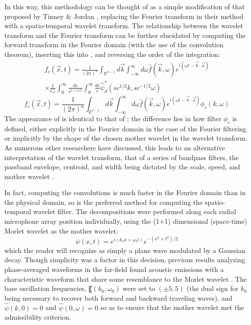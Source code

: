 In this way, this methodology can be thought of as a simple modification of that proposed by Tinney \& Jordan \citep{Tinney2008}, replacing the Fourier transform in their method with a spatio-temporal wavelet transform. 
The relationship between the wavelet transform and the Fourier transform can be further elucidated by computing the forward transform in the Fourier domain (with the use of the convolution theorem), inserting this into , and reversing the order of the integration:
\begin{multline}
		f_c (\vec{x},t) = \frac{1}{(2 \pi)^n} \int_{\mathbb{R}^{n-1}} d \vec{k} \int_{-\infty}^{\infty} d\omega \hat{f}(\vec{k},\omega) e^{i(\omega t - \vec{k} \cdot \vec{x})} \\ 
		\times \frac{1}{C_\delta} \int_0^\infty \frac{ds}{s^{1 + n/2}} \int_{0}^{\infty} \frac{dc}{c} \hat{\psi}_d^* (sc^{1/2}k,sc^{-1/2} \omega)
\end{multline}
\begin{equation}
	f_c (\vec{x},t) = \frac{1}{(2 \pi)^n} \int_{\mathbb{R}^{n-1}} d \vec{k} \int_{-\infty}^{\infty} d\omega \hat{f}(\vec{k},\omega) e^{i(\omega t - \vec{k} \cdot \vec{x})} \phi_c (k,\omega)
	\label{eq:wavelet_filter_simplified}
\end{equation}
The appearance of  is identical to that of ; the difference lies in how filter $\phi_c$ is defined, either explicitly in the Fourier domain in the case of the Fourier filtering or implicitly by the shape of the chosen mother wavelet in the wavelet transform. 
As numerous other researchers have discussed, this leads to an alternative interpretation of the wavelet transform, that of a series of bandpass filters, the passband envelope, centroid, and width being dictated by the scale, speed, and mother wavelet \citep{Farge1992,Torrence1998}.

In fact, computing the convolutions is much faster in the Fourier domain than in the physical domain, so  is the preferred method for computing the spatio-temporal wavelet filter.
The decompositions were performed along each radial microphone array position individually, using the (1+1) dimensional (space-time) Morlet wavelet as the mother wavelet:
\begin{equation}
	\psi (x,t) = e^{i(k_o x + \omega_0 t)} e^{-(x^2 + t^2)/2}
\end{equation}
which the reader will recognize as simply a plane wave modulated by a Gaussian decay. 
Though simplicity was a factor in this decision, previous results analyzing phase-averaged waveforms in the far-field found acoustic emissions with a characteristic waveform that share some resemblance to the Morlet wavelet \citep{Crawley2015}. 
The base oscillation frequencies, 〖$(k_0,\omega_0)$ were set to $(\pm 5,5)$ (the dual sign for $k_0$ being necessary to recover both forward and backward traveling waves), and $\hat{\psi}(k,0) = 0$ and $\hat{\psi}(0,\omega) = 0$ so as to ensure that the mother wavelet met the admissibility criterion.

